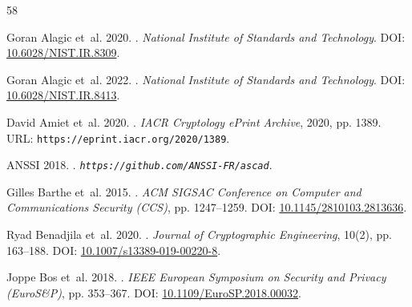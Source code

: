 \documentclass[letterpaper]{article}
\begin{document}
\begin{thebibliography}{58}
\providecommand{\natexlab}[1]{#1}
\providecommand{\url}[1]{\texttt{#1}}

Goran Alagic et~al. 2020.
.
\newblock \emph{National Institute of Standards and Technology}.
\newblock DOI: \href{https://doi.org/10.6028/NIST.IR.8309}{10.6028/NIST.IR.8309}.

Goran Alagic et~al. 2022.
.
\newblock \emph{National Institute of Standards and Technology}.
\newblock DOI: \href{https://doi.org/10.6028/NIST.IR.8413}{10.6028/NIST.IR.8413}.

David Amiet et~al. 2020.
.
\newblock \emph{IACR Cryptology ePrint Archive}, 2020, pp. 1389.
\newblock URL: \url{https://eprint.iacr.org/2020/1389}.

{ANSSI} 2018.
.
\newblock \emph{\url{https://github.com/ANSSI-FR/ascad}}.

Gilles Barthe et~al. 2015.
.
\newblock \emph{ACM SIGSAC Conference on Computer and Communications Security (CCS)}, pp. 1247--1259.
\newblock DOI: \href{https://doi.org/10.1145/2810103.2813636}{10.1145/2810103.2813636}.

Ryad Benadjila et~al. 2020.
.
\newblock \emph{Journal of Cryptographic Engineering}, 10(2), pp. 163--188.
\newblock DOI: \href{https://doi.org/10.1007/s13389-019-00220-8}{10.1007/s13389-019-00220-8}.

Joppe Bos et~al. 2018.
.
\newblock \emph{IEEE European Symposium on Security and Privacy (EuroS\&P)}, pp. 353--367.
\newblock DOI: \href{https://doi.org/10.1109/EuroSP.2018.00032}{10.1109/EuroSP.2018.00032}.


\end{thebibliography}
\end{document}
